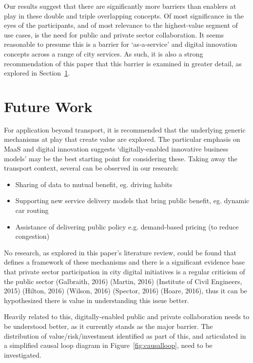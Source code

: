 \documentclass[journal]{IEEEtran}
\begin{document}
Our results suggest that there are significantly more barriers than
enablers at play in these double and triple overlapping concepts. Of
most significance in the eyes of the participants, and of most
relevance to the highest-value segment of use cases, is the need for
public and private sector collaboration. It seems reasonable to
presume this is a barrier for `as-a-service' and digital innovation
concepts across a range of city services. As such, it is also a strong
recommendation of this paper that this barrier is examined in greater
detail, as explored in Section~\ref{future}.


\section{Future Work}\label{future}

For application beyond transport, it is recommended that the
underlying generic mechanisms at play that create value are
explored. The particular emphasis on MaaS and digital innovation
suggests `digitally-enabled innovative business models' may be the
best starting point for considering these. Taking away the transport
context, several can be observed in our research:

\begin{itemize}
\item Sharing of data to mutual benefit, eg. driving habits
\item Supporting new service delivery models that bring public
benefit, eg. dynamic car routing
\item Assistance of delivering public policy e.g. demand-based pricing
(to reduce congestion)
\end{itemize}

No research, as explored in this paper’s literature review, could be
found that defines a framework of these mechanisms and there is a
significant evidence base that private sector participation in city
digital initiatives is a regular criticism of the public sector
(Galbraith, 2016) (Martin, 2016) (Institute of Civil Engineers, 2015)
(Hilton, 2016) (Wilson, 2016) (Spector, 2016) (Hoare, 2016), thus it
can be hypothesized there is value in understanding this issue better.

Heavily related to this, digitally-enabled public and private
collaboration needs to be understood better, as it currently stands as
the major barrier. The distribution of value/risk/investment
identified as part of this, and articulated in a simplified causal
loop diagram in Figure~\ref{fig:causalloop}, need to be investigated.
\end{document}
